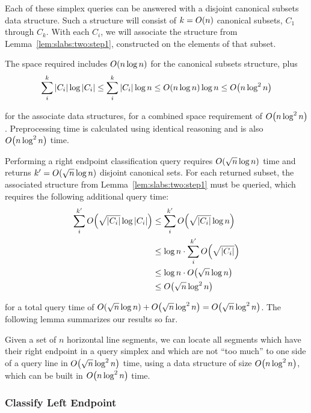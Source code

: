 Each of these simplex queries can be answered with a disjoint canonical subsets data structure. Such a structure will consist of $k = O\!\left(n\right)$ canonical subsets, $C_1$ through $C_k$. With each $C_i$, we will associate the structure from Lemma~\ref{lem:slabs:two:step1}, constructed on the elements of that subset.

The space required includes $O\!\left(n \log{n}\right)$ for the canonical subsets structure, plus
\[
\sum_{i}^{k}{|C_i| \log{|C_i|}} 
\leq \sum_{i}^{k}{|C_i| \log{n}} 
\leq O\!\left(n\log{n}\right) \log{n} 
\leq O\!\left(n \log^2{n}\right)
\]

\noindent for the associate data structures, for a combined space requirement of $O\!\left(n\log^2{n}\right)$. Preprocessing time is calculated using identical reasoning and is also $O\!\left(n \log^2{n}\right)$ time.

Performing a right endpoint classification query requires $O\!\left(\sqrt{n}\log{n}\right)$ time and returns $k' = O\!\left(\sqrt{n}\log{n}\right)$ disjoint canonical sets. For each returned subset, the associated structure from Lemma~\ref{lem:slabs:two:step1} must be queried, which requires the following additional query time:
\[
\begin{split}
\sum_{i}^{k'}{\BigOh{\sqrt{|C_i|}\log{|C_i|}}} 
&\leq \sum_{i}^{k'}{\BigOh{\sqrt{|C_i|} \log{n}}} \\
%
&\leq \log{n} \cdot \sum_{i}^{k'}{\BigOh{\sqrt{|C_i|}}} \\
%
&\leq \log{n} \cdot \BigOh{\sqrt{n}\log{n}} \\
%
&\leq \BigOh{\sqrt{n}\log^2{n}} \\
%
\end{split}
\]

\noindent for a total query time of $O\!\left(\sqrt{n}\log{n}\right) + O\!\left(\sqrt{n}\log^2{n}\right) = O\!\left(\sqrt{n}\log^2{n}\right)$. The following lemma summarizes our results so far.

\begin{lemma}
\label{lem:slabs:two:step2}
Given a set of $n$ horizontal line segments, we can locate all segments which have their right endpoint in a query simplex and which are not ``too much'' to one side of a query line in $O\!\left(\sqrt{n}\log^2{n}\right)$ time, using a data structure of size $O\!\left(n\log^2{n}\right)$, which can be built in $O\!\left(n\log^2{n}\right)$ time.
\end{lemma}


\subsubsection{Classify Left Endpoint}

